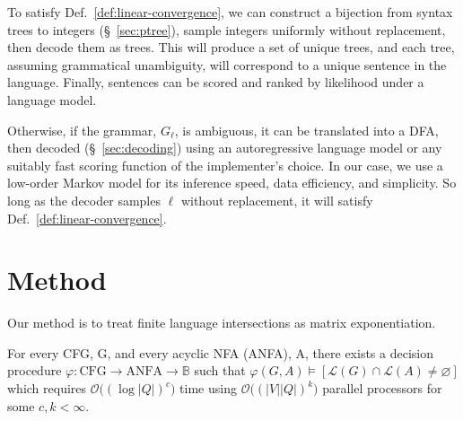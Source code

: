 \documentclass[sigplan,review,acmsmall,nonacm,screen,anonymous]{acmart}\settopmatter{printfolios=false,printccs=false,printacmref=false}
\begin{document}
To satisfy Def.~\ref{def:linear-convergence}, we can construct a bijection from syntax trees to integers (\S~\ref{sec:ptree}), sample integers uniformly without replacement, then decode them as trees. This will produce a set of unique trees, and each tree, assuming grammatical unambiguity, will correspond to a unique sentence in the language.  Finally, sentences can be scored and ranked by likelihood under a language model.

Otherwise, if the grammar, $G_\ell$, is ambiguous, it can be translated into a DFA, then decoded (\S~\ref{sec:decoding}) using an autoregressive language model or any suitably fast scoring function of the implementer's choice. In our case, we use a low-order Markov model for its inference speed, data efficiency, and simplicity. So long as the decoder samples $\ell$ without replacement, it will satisfy Def.~\ref{def:linear-convergence}.


\clearpage\section{Method}

Our method is to treat finite language intersections as matrix exponentiation.

\begin{theorem}%
  For every CFG, G, and every acyclic NFA (ANFA), A, there exists a decision procedure $\varphi: \text{CFG} \rightarrow \text{ANFA} \rightarrow \mathbb{B}$ such that $\varphi(G, A) \models [\mathcal{L}(G)\cap\mathcal{L}(A) \neq \varnothing]$ which requires $\mathcal{O}\big((\log |Q|)^c\big)$ time using $\mathcal{O}\big((|V||Q|)^k\big)$ parallel processors for some $c, k < \infty$.
\end{theorem}
\end{document}
